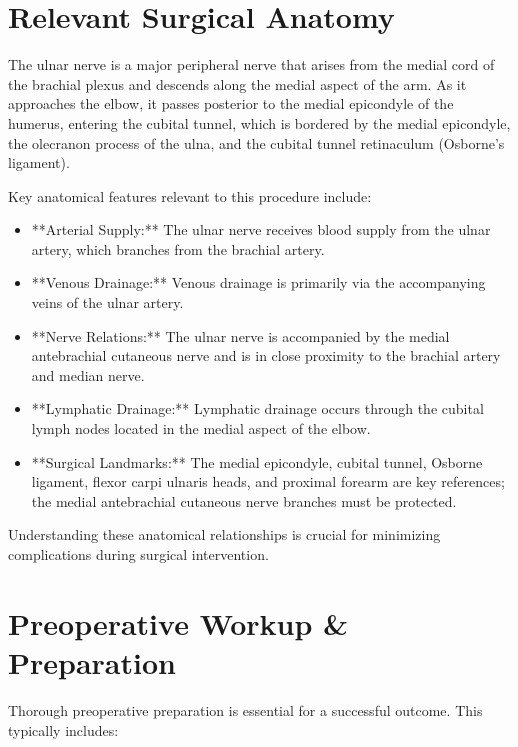 \section*{Relevant Surgical Anatomy}
The ulnar nerve is a major peripheral nerve that arises from the medial cord of the brachial plexus and descends along the medial aspect of the arm. As it approaches the elbow, it passes posterior to the medial epicondyle of the humerus, entering the cubital tunnel, which is bordered by the medial epicondyle, the olecranon process of the ulna, and the cubital tunnel retinaculum (Osborne's ligament). 

Key anatomical features relevant to this procedure include:

\begin{itemize}
  \item **Arterial Supply:** The ulnar nerve receives blood supply from the ulnar artery, which branches from the brachial artery.
  \item **Venous Drainage:** Venous drainage is primarily via the accompanying veins of the ulnar artery.
  \item **Nerve Relations:** The ulnar nerve is accompanied by the medial antebrachial cutaneous nerve and is in close proximity to the brachial artery and median nerve.
  \item **Lymphatic Drainage:** Lymphatic drainage occurs through the cubital lymph nodes located in the medial aspect of the elbow.
  \item **Surgical Landmarks:** The medial epicondyle, cubital tunnel, Osborne ligament, flexor carpi ulnaris heads, and proximal forearm are key references; the medial antebrachial cutaneous nerve branches must be protected.
\end{itemize}

Understanding these anatomical relationships is crucial for minimizing complications during surgical intervention.

\section*{Preoperative Workup \& Preparation}
Thorough preoperative preparation is essential for a successful outcome. This typically includes:


